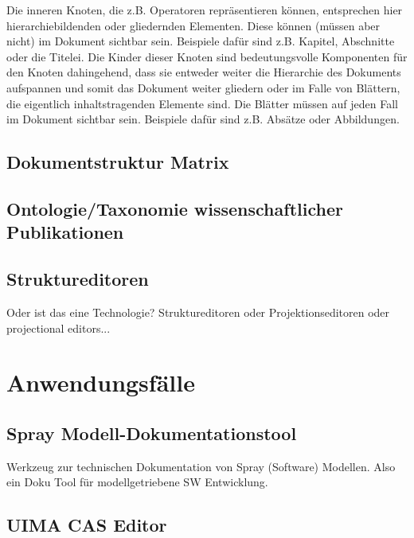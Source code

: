 Die inneren Knoten, die z.B. Operatoren repräsentieren können, entsprechen hier
hierarchiebildenden oder gliedernden Elementen.
Diese können (müssen aber nicht) im Dokument sichtbar sein.
Beispiele dafür sind z.B. Kapitel, Abschnitte oder die Titelei.
Die Kinder dieser Knoten sind bedeutungsvolle Komponenten für den Knoten dahingehend,
dass sie entweder weiter die Hierarchie des Dokuments aufspannen und somit das
Dokument weiter gliedern oder im Falle von Blättern, die eigentlich inhaltstragenden
Elemente sind.
Die Blätter müssen auf jeden Fall im Dokument sichtbar sein.
Beispiele dafür sind z.B. Absätze oder Abbildungen.


\section{Dokumentstruktur Matrix}


\section{Ontologie/Taxonomie wissenschaftlicher Publikationen}


\section{Struktureditoren}

Oder ist das eine Technologie?
Struktureditoren oder Projektionseditoren oder projectional editors...



\chapter{Anwendungsfälle}

\section{Spray Modell-Dokumentationstool}

Werkzeug zur technischen Dokumentation von Spray (Software) Modellen.
Also ein Doku Tool für modellgetriebene SW Entwicklung.

\section{UIMA CAS Editor}

